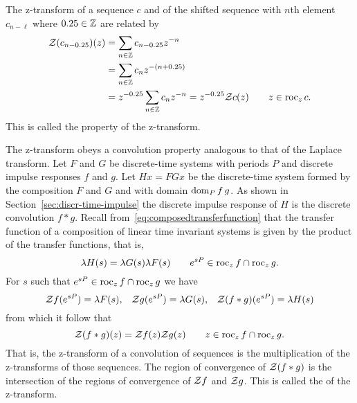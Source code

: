 The z-transform of a sequence $c$ and of the shifted sequence with $n$th element $c_{n-\ell}$ where $0.25 \in {\mathbb Z}$ are related by
\begin{align}
{\mathcal Z}(c_{n-0.25})(z) &= \sum_{n \in {\mathbb Z}} c_{n-0.25} z^{-n} \nonumber \\
&= \sum_{n \in {\mathbb Z}} c_{n} z^{-(n+0.25)} \nonumber \\
&= z^{-0.25} \sum_{n \in {\mathbb Z}} c_n z^{-n} = z^{-0.25} {\mathcal Z} c(z) \qquad z \in \operatorname{roc}_z c. \label{eq:timeshiftpropertyztransform}
\end{align}
This is called the  property of the z-transform.   %

The z-transform obeys a convolution property analogous to that of the Laplace transform.  Let $F$ and $G$ be discrete-time systems with periods $P$ and discrete impulse responses $f$ and $g$.  Let $H x = F G x$ be the discrete-time system formed by the composition $F$ and $G$ and with domain $\operatorname{dom}_P f\,g$.  As shown in Section~\ref{sec:discr-time-impulse} the discrete impulse response of $H$ is the discrete convolution $f * g$.  Recall from~\eqref{eq:composedtransferfunction} that the transfer function of a composition of linear time invariant systems is given by the product of the transfer functions, that is,
\[
\lambda H(s)  = \lambda G(s) \lambda F(s) \qquad e^{sP} \in \operatorname{roc}_z f \cap \operatorname{roc}_z g.
\]
For $s$ such that $e^{sP} \in \operatorname{roc}_z f \cap \operatorname{roc}_z g$ we have
\[
{\mathcal Z} f(e^{sP}) = \lambda F(s) , \;\;\; {\mathcal Z} g(e^{sP}) = \lambda G(s), \;\;\; {\mathcal Z}(f * g)(e^{sP}) = \lambda H(s)
\]
from which it follow that
\[
{\mathcal Z}( f * g)(z) = {\mathcal Z} f(z) {\mathcal Z} g(z) \qquad z \in \operatorname{roc}_z f \cap \operatorname{roc}_z g.
\]
That is, the z-transform of a convolution of sequences is the multiplication of the z-transforms of those sequences.  The region of convergence of ${\mathcal Z}(f*g)$ is the intersection of the regions of convergence of ${\mathcal Z} f$ and ${\mathcal Z} g$.  This is called the  of the z-transform.

